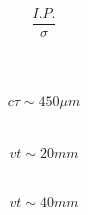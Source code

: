 \documentclass[a4paper,12pt, onecolumn]{article}
\begin{document}
 
  \begin{equation}
    \frac{{I.P.}}{\sigma}
   \end{equation}
  \\
  \\
  \\
  
  \begin{equation}
    c\tau \sim 450 \mu m
   \end{equation}
  \\ \\

  \begin{equation}
   vt \sim 20mm
   \end{equation}
  \\ \\

  \begin{equation}
    vt \sim 40mm
   \end{equation}
  \\ \\


  
\end{document}
